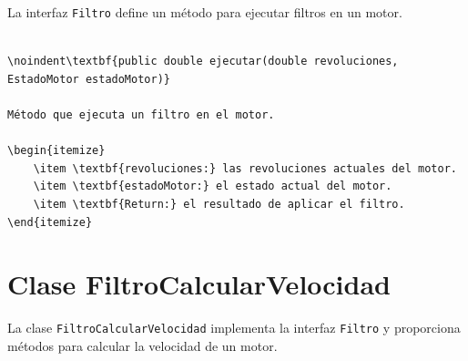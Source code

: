 \documentclass{article}
\begin{document}
La interfaz \texttt{Filtro} define un método para ejecutar filtros en un motor.

\begin{lstlisting}

\noindent\textbf{public double ejecutar(double revoluciones, EstadoMotor estadoMotor)}

Método que ejecuta un filtro en el motor.

\begin{itemize}
    \item \textbf{revoluciones:} las revoluciones actuales del motor.
    \item \textbf{estadoMotor:} el estado actual del motor.
    \item \textbf{Return:} el resultado de aplicar el filtro.
\end{itemize}

\end{lstlisting}



\section{Clase FiltroCalcularVelocidad}

La clase \texttt{FiltroCalcularVelocidad} implementa la interfaz \texttt{Filtro} y proporciona métodos para calcular la velocidad de un motor.
\end{document}
